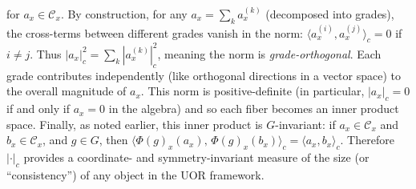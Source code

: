 \documentclass[12pt]{article}
\begin{document}
\begin{itemize}
\[    \] 
    for $a_x \in \mathcal{C}_x$. By construction, for any $a_x = \sum_k a_x^{(k)}$ (decomposed into grades), the cross-terms between different grades vanish in the norm: $\langle a_x^{(i)}, a_x^{(j)}\rangle_c = 0$ if $i\neq j$. Thus $|a_x|_c^2 = \sum_k |a_x^{(k)}|_c^2$, meaning the norm is \emph{grade-orthogonal}. Each grade contributes independently (like orthogonal directions in a vector space) to the overall magnitude of $a_x$. This norm is positive-definite (in particular, $|a_x|_c = 0$ if and only if $a_x = 0$ in the algebra) and so each fiber becomes an inner product space. Finally, as noted earlier, this inner product is $G$-invariant: if $a_x \in \mathcal{C}_x$ and $b_x \in \mathcal{C}_x$, and $g\in G$, then $\langle \Phi(g)_x(a_x),\,\Phi(g)_x(b_x)\rangle_c = \langle a_x, b_x\rangle_c$. Therefore $|\cdot|_c$ provides a coordinate- and symmetry-invariant measure of the size (or “consistency”) of any object in the UOR framework.


\end{itemize}
\end{document}
